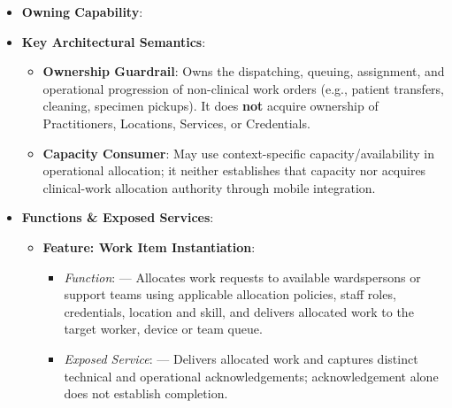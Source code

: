 \begin{itemize}

\item
\textbf{Owning Capability}: \texttt{}



\item
\textbf{Key Architectural Semantics}:


\begin{itemize}

\item
\textbf{Ownership Guardrail}: Owns the dispatching, queuing, assignment, and operational progression of non-clinical work orders (e.g., patient transfers, cleaning, specimen pickups). It does \textbf{not} acquire ownership of Practitioners, Locations, Services, or Credentials.



\item
\textbf{Capacity Consumer}: May use context-specific capacity/\allowbreak{}availability in operational allocation; it neither establishes that capacity nor acquires clinical-work allocation authority through mobile integration.



\end{itemize}


\item
\textbf{Functions \& Exposed Services}:


\begin{itemize}

\item
\textbf{Feature: Work Item Instantiation}:


\begin{itemize}

\item
\emph{Function}: \texttt{} — Allocates work requests to available wardspersons or support teams using applicable allocation policies, staff roles, credentials, location and skill, and delivers allocated work to the target worker, device or team queue.



\item
\emph{Exposed Service}: \texttt{} — Delivers allocated work and captures distinct technical and operational acknowledgements; acknowledgement alone does not establish completion.




\end{itemize}
\end{itemize}
\end{itemize}
